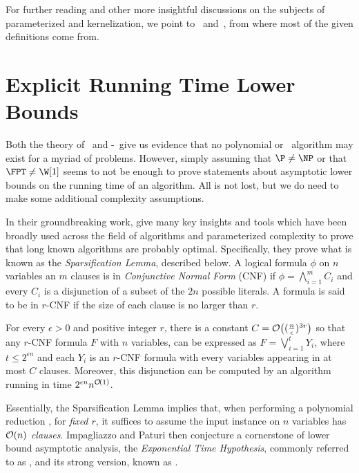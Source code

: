 For further reading and other more insightful discussions on the subjects of parameterized and kernelization, we point to~\citep{downey_fellows} and~\citep{cygan_parameterized}, from where most of the given definitions come from. 

\section{Explicit Running Time Lower Bounds}

Both the theory of \NPcness\ and \W[1]-\Hness\ give us evidence that no polynomial or \FPT\ algorithm may exist for a myriad of problems.
However, simply assuming that $\P \neq \NP$ or that $\FPT \neq \W[1]$ seems to not be enough to prove statements about asymptotic lower bounds on the running time of an algorithm.
All is not lost, but we do need to make some additional complexity assumptions.

In their groundbreaking work, \cite{eth} give many key insights and tools which have been broadly used across the field of algorithms and parameterized complexity to prove that long known algorithms are probably optimal.
Specifically, they prove what is known as the \textit{Sparsification Lemma}, described below.
A logical formula $\phi$ on $n$ variables an $m$ clauses is in \textit{Conjunctive Normal Form} (CNF) if $\phi = \bigwedge_{i=1}^m C_i$ and every $C_i$ is a disjunction of a subset of the $2n$ possible literals.
A formula is said to be in $r$-CNF if the size of each clause is no larger than $r$.

\begin{class_definition*}
    For every $\epsilon > 0$ and positive
    integer $r$, there is a constant $C = \mathcal{O}\!\left((\frac{n}{\epsilon})^{3r}\right)$ so that any $r$-CNF formula $F$ with $n$ variables, can be expressed as $F = \bigvee_{i=1}^t Y_i$, where $t \leq 2^{\epsilon n}$ and each $Y_i$ is an $r$-CNF formula with every variables appearing in at most $C$ clauses.
    Moreover, this disjunction can be computed by an algorithm running in time $2^{\epsilon n}n^{\mathcal{O}\!\left(1\right)}$.
\end{class_definition*}

Essentially, the Sparsification Lemma implies that, when performing a polynomial reduction , for \textit{fixed $r$}, it suffices to assume the input instance on $n$ variables has $\mathcal{O}\!\left(n\right)$ \textit{clauses}.
Impagliazzo and Paturi then conjecture a cornerstone of lower bound asymptotic analysis, the \textit{Exponential Time Hypothesis}, commonly referred to as \ETH, and its strong version, known as \SETH.

